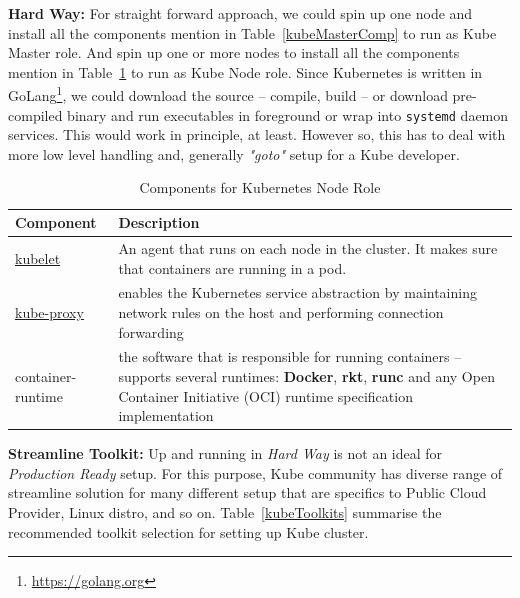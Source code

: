 \noindent \textbf{Hard Way:} \quad For straight forward approach, we could spin up one node and install all the components mention in Table~\ref{kubeMasterComp} to run as Kube Master role. And spin up one or more nodes to install all the components mention in Table~\ref{kubeNodeComp} to run as Kube Node role. Since Kubernetes is written in GoLang\footnote{\url{https://golang.org}}, we could download the source -- compile, build -- or download pre-compiled binary and run executables in foreground or wrap into \verb|systemd| daemon services. This would work in principle, at least. However so, this has to deal with more low level handling and, generally \emph{"goto"} setup for a Kube developer.

\begin{table}[H]
\centering
    \begin{tabular}{ | l | p{11cm} |}
    \hline
    Component & Description \\ \hline
    \href{https://kubernetes.io/docs/reference/command-line-tools-reference/kubelet/}{kubelet} & An agent that runs on each node in the cluster. It makes sure that containers are running in a pod. \\ \hline
    \href{https://kubernetes.io/docs/reference/command-line-tools-reference/kube-proxy/}{kube-proxy} & enables the Kubernetes service abstraction by maintaining network rules on the host and performing connection forwarding \\  \hline
    container-runtime & the software that is responsible for running containers -- supports several runtimes: \textbf{Docker}, \textbf{rkt}, \textbf{runc} and any Open Container Initiative (OCI) runtime specification implementation \\
    \hline
    \end{tabular}
\caption{Components for Kubernetes Node Role}
\label{kubeNodeComp}  
\end{table}

\noindent \textbf{Streamline Toolkit:} \quad Up and running in \emph{Hard Way} is not an ideal for \emph{Production Ready} setup. For this purpose, Kube community has diverse range of streamline solution for many different setup that are specifics to Public Cloud Provider, Linux distro, and so on. Table~\ref{kubeToolkits} summarise the recommended toolkit selection for setting up Kube cluster. 

